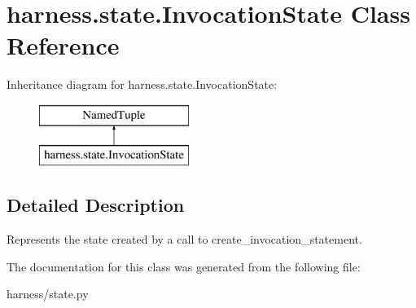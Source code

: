 \hypertarget{classharness_1_1state_1_1_invocation_state}{}\section{harness.\+state.\+Invocation\+State Class Reference}
\label{classharness_1_1state_1_1_invocation_state}
Inheritance diagram for harness.\+state.\+Invocation\+State\+:\begin{figure}[H]
\begin{center}
\leavevmode
\includegraphics[height=2.000000cm]{dc/d23/classharness_1_1state_1_1_invocation_state}
\end{center}
\end{figure}


\subsection{Detailed Description}
\begin{DoxyVerb}Represents the state created by a call to
create_invocation_statement.
\end{DoxyVerb}
 

The documentation for this class was generated from the following file\+:\begin{DoxyCompactItemize}
\item 
harness/state.\+py\end{DoxyCompactItemize}
